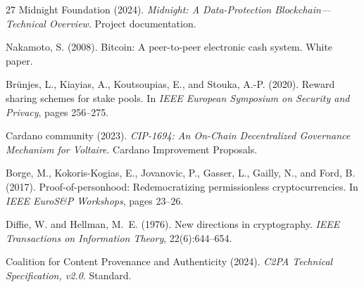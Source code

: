 \documentclass[11pt,UTF8]{ctexart}
\begin{document}
\begin{thebibliography}{27}
Midnight Foundation (2024). \emph{Midnight: A Data-Protection
Blockchain---Technical Overview}. Project documentation.

Nakamoto, S. (2008). Bitcoin: A peer-to-peer electronic cash system.
White paper.

Br\"unjes, L., Kiayias, A., Koutsoupias, E., and Stouka, A.-P. (2020).
Reward sharing schemes for stake pools. In \emph{IEEE European Symposium
on Security and Privacy}, pages 256--275.

Cardano community (2023). \emph{CIP-1694: An On-Chain Decentralized
Governance Mechanism for Voltaire}. Cardano Improvement Proposals.

Borge, M., Kokoris-Kogias, E., Jovanovic, P., Gasser, L., Gailly, N., and
Ford, B. (2017). Proof-of-personhood: Redemocratizing permissionless
cryptocurrencies. In \emph{IEEE EuroS\&P Workshops}, pages 23--26.

Diffie, W. and Hellman, M.~E. (1976). New directions in cryptography.
\emph{IEEE Transactions on Information Theory}, 22(6):644--654.

Coalition for Content Provenance and Authenticity (2024). \emph{C2PA
Technical Specification, v2.0}. Standard.

\end{thebibliography}
\end{document}
